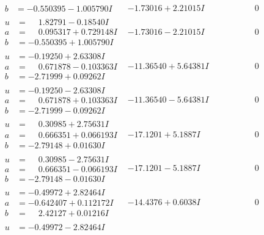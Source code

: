 \documentclass[1p]{elsarticle_modified}
\theoremstyle{definition}
\begin{document}
$$\begin{array}{c|c|c}
\begin{aligned}
b &= -0.550395 - 1.005790 I\end{aligned}
 & -1.73016 + 2.21015 I & \phantom{-0.000000 } 0 \\ \hline\begin{aligned}
u &= \phantom{-}1.82791 - 0.18540 I \\
a &= \phantom{-}0.095317 + 0.729148 I \\
b &= -0.550395 + 1.005790 I\end{aligned}
 & -1.73016 - 2.21015 I & \phantom{-0.000000 } 0 \\ \hline\begin{aligned}
u &= -0.19250 + 2.63308 I \\
a &= \phantom{-}0.671878 - 0.103363 I \\
b &= -2.71999 + 0.09262 I\end{aligned}
 & -11.36540 + 5.64381 I & \phantom{-0.000000 } 0 \\ \hline\begin{aligned}
u &= -0.19250 - 2.63308 I \\
a &= \phantom{-}0.671878 + 0.103363 I \\
b &= -2.71999 - 0.09262 I\end{aligned}
 & -11.36540 - 5.64381 I & \phantom{-0.000000 } 0 \\ \hline\begin{aligned}
u &= \phantom{-}0.30985 + 2.75631 I \\
a &= \phantom{-}0.666351 + 0.066193 I \\
b &= -2.79148 + 0.01630 I\end{aligned}
 & -17.1201 + 5.1887 I & \phantom{-0.000000 } 0 \\ \hline\begin{aligned}
u &= \phantom{-}0.30985 - 2.75631 I \\
a &= \phantom{-}0.666351 - 0.066193 I \\
b &= -2.79148 - 0.01630 I\end{aligned}
 & -17.1201 - 5.1887 I & \phantom{-0.000000 } 0 \\ \hline\begin{aligned}
u &= -0.49972 + 2.82464 I \\
a &= -0.642407 + 0.112172 I \\
b &= \phantom{-}2.42127 + 0.01216 I\end{aligned}
 & -14.4376 + 0.6038 I & \phantom{-0.000000 } 0 \\ \hline\begin{aligned}
u &= -0.49972 - 2.82464 I \\

\end{aligned}
\end{array}$$
\end{document}
